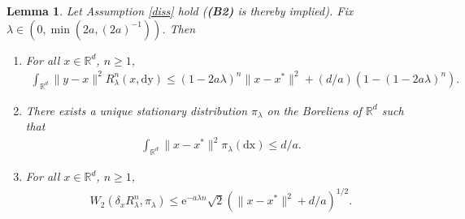 \documentclass[a4paper]{article}
\newtheorem{lemma}[theorem]{Lemma}
\def\e{\text{e}}
\def\Rl{R_{\lambda}}
\def\Rd{\mathbb{R}^{d}}
\begin{document}
\begin{lemma}\label{prop4}
Let Assumption \ref{diss} hold ({\bf (B2)} is thereby implied). Fix $\lambda \in (0,\min(2a,(2a)^{-1}))$. Then
\begin{enumerate}
	\item[(i)] For all $x \in \Rd$, $n \geq 1$,
	\begin{align*}
	\int_{\Rd}\|y-x\|^2R_{\lambda}^n(x,\mathrm{dy})\leq (1-2a\lambda)^{n}\|x-x^*\|^2+(d/a)(1-(1-2a\lambda)^n).
	\end{align*}
	\item[(ii)] There exists a unique stationary distribution $\pi_{\lambda}$ on the Boreliens of $\mathbb{R}^{d}$ such that
	\begin{align*}
	\int_{\Rd}\|x-x^*\|^2\pi_{\lambda}(\mathrm{dx}) \leq d/a.
	\end{align*}
	\item[(iii)] For all $x \in \Rd$, $n \geq 1$,
	\begin{align*}
	W_2(\delta_x \Rl^n, \pi_{\lambda})\leq \e^{-a\lambda n}\sqrt{2}( \|x-x^*\|^2+d/a)^{1/2}.
	\end{align*}
\end{enumerate} 
\end{lemma}
\end{document}
